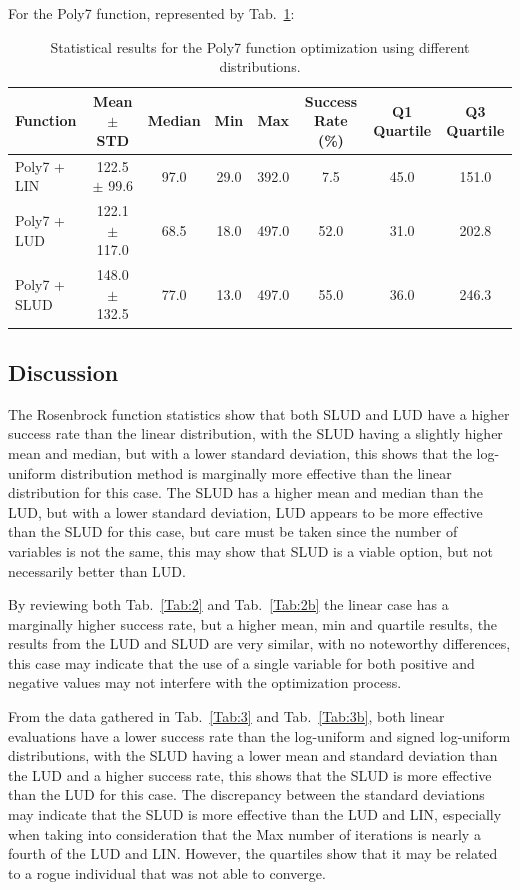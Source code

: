 \documentclass[10pt,fleqn,a4paper,twoside]{article}
\begin{document}
For the Poly7 function, represented by Tab.~\ref{Tab:4}:

\begin{table}[H]
\centering
\caption{Statistical results for the Poly7 function optimization using different distributions.}
\label{Tab:4}
\begin{tabular}{l|c|c|c|c|c|c|c}
\hline
\textbf{Function} & \textbf{Mean $\pm$ STD} & \textbf{Median} & \textbf{Min} & \textbf{Max} & \textbf{Success Rate (\%)} & \textbf{Q1 Quartile} & \textbf{Q3 Quartile}\\
\hline
Poly7 + LIN          & 122.5 $\pm$ 99.6      & 97.0 & 29.0 & 392.0 & 7.5 & 45.0 & 151.0\\
Poly7 + LUD          & 122.1 $\pm$ 117.0     & 68.5 & 18.0 & 497.0 & 52.0 & 31.0 & 202.8\\
Poly7 + SLUD         & 148.0 $\pm$ 132.5     & 77.0 & 13.0 & 497.0 & 55.0 & 36.0 & 246.3\\
\hline
\end{tabular}
\end{table}


\subsection{Discussion}

The Rosenbrock function statistics show that both SLUD and LUD have a higher success rate than the linear distribution, with the SLUD having a slightly higher mean and median, but with a lower standard deviation, 
this shows that the log-uniform distribution method is marginally more effective than the linear distribution for this case. The SLUD has a higher mean and median than the LUD, but with a lower standard deviation, 
LUD appears to be more effective than the SLUD for this case, but care must be taken since the number of variables is not the same, this may show that SLUD is a viable option, but not necessarily better than LUD.


By reviewing both Tab.~\ref{Tab:2} and Tab.~\ref{Tab:2b} the linear case has a marginally higher success rate, but a higher mean, min and 
quartile results, the results from the LUD and SLUD are very similar, with no noteworthy differences, this case may indicate that
the use of a single variable for both positive and negative values may not interfere with the optimization process.


From the data gathered in Tab.~\ref{Tab:3} and Tab.~\ref{Tab:3b}, both linear evaluations have a lower success rate than the log-uniform and signed log-uniform distributions, with the SLUD having a
lower mean and standard deviation than the LUD and a higher success rate, this shows that the SLUD is more effective than the LUD for this case. The discrepancy between the standard deviations
may indicate that the SLUD is more effective than the LUD and LIN, especially when taking into consideration that the Max number of iterations is nearly a fourth of the LUD and LIN. However, the
quartiles show that it may be related to a rogue individual that was not able to converge.
\end{document}
